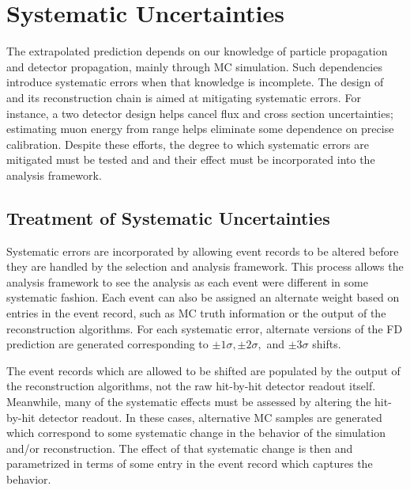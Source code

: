 \chapter{Systematic Uncertainties}
\label{systs_chapter}

The extrapolated prediction depends on our knowledge of particle propagation
and detector propagation, mainly through MC simulation.
Such dependencies introduce systematic errors when that knowledge is incomplete.
The design of \nova and its reconstruction chain is aimed at mitigating
systematic errors.
For instance, a two detector design helps
cancel flux and cross section uncertainties; estimating muon energy
from range helps eliminate some dependence on precise calibration.
Despite these efforts, the degree to which systematic errors are mitigated
must be tested and and their effect must be incorporated into the
analysis framework.


\section{Treatment of Systematic Uncertainties}

Systematic errors are incorporated by allowing
event records to be altered before they are handled by the
selection and analysis framework.
This process allows the analysis framework to see the analysis as each
event were different in some systematic fashion.
Each event can also be assigned an alternate weight based
on entries in the event record, such as MC truth information or
the output of the reconstruction algorithms.
For each systematic error, alternate versions of the FD prediction
are generated corresponding to $\pm 1\sigma, \pm2\sigma,$ and
$\pm3\sigma$ shifts.

The event records which are allowed to be shifted are populated by
the output of the reconstruction algorithms,
not the raw hit-by-hit detector readout itself.
Meanwhile, many of the systematic effects must be assessed by altering the
hit-by-hit detector readout.
In these cases, alternative MC samples are generated which
correspond to some systematic change in the behavior of the
simulation and/or reconstruction.
The effect of that systematic change is then
and parametrized in terms of some entry in the event record which
captures the behavior.

